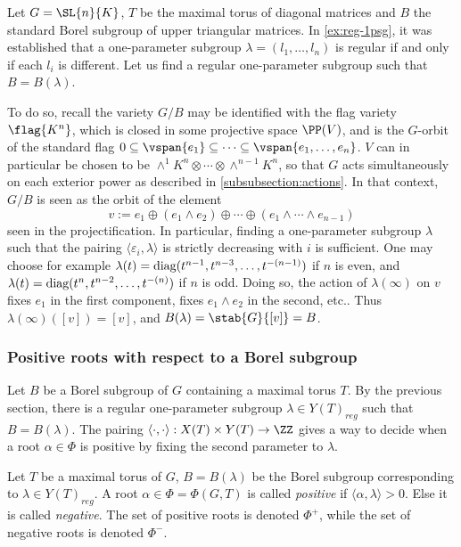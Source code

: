 \begin{exmp}\label{ex:reg_1psg_borel}
    Let $G = \SL{n}{K}$, $T$ be the maximal torus of diagonal matrices and $B$ the standard Borel subgroup of upper triangular matrices. In \cref{ex:reg-1psg}, it was established that a one-parameter subgroup $\lambda = (l_1, \ldots, l_n)$ is regular if and only if each $l_i$ is different. Let us find a regular one-parameter subgroup such that $B = B(\lambda)$.

    To do so, recall the variety $G/B$ may be identified with the flag variety $\flag{K^n}$, which is closed in some projective space $\PP(V)$, and is the $G$-orbit of the standard flag ${0 \subseteq \vspan{e_1} \subseteq \cdots \subseteq \vspan{e_1, \ldots, e_n}}$. $V$ can in particular be chosen to be ${\wedge^1 K^n \otimes \cdots \otimes \wedge^{n-1} K^n}$, so that $G$ acts simultaneously on each exterior power as described in \cref{subsubsection:actions}. In that context, $G/B$ is seen as the orbit of the element
    \[ v := e_1 \oplus \left(e_1 \wedge e_2 \right) \oplus \cdots \oplus \left(e_1 \wedge \cdots \wedge e_{n-1}\right)\]
    seen in the projectification. In particular, finding a one-parameter subgroup $\lambda$ such that the pairing $\langle \varepsilon_i, \lambda \rangle$ is strictly decreasing with $i$ is sufficient. One may choose for example $\lambda(t) = \textnormal{diag}(t^{n-1}, t^{n-3},\ldots, t^{-(n-1)})$ if $n$ is even, and $\lambda(t) = \textnormal{diag}(t^{n}, t^{n-2},\ldots, t^{-(n)})$ if $n$ is odd. Doing so, the action of $\lambda(\infty)$ on $v$ fixes $e_1$ in the first component, fixes $e_1 \wedge e_2$ in the second, etc.. Thus $\lambda(\infty)([v]) = [v]$, and $B(\lambda) = \stab{G}{[v]} = B$.
\end{exmp}

\subsubsection{Positive roots with respect to a Borel subgroup}

Let $B$ be a Borel subgroup of $G$ containing a maximal torus $T$. By the previous section, there is a regular one-parameter subgroup $\lambda \in {Y(T)}_{reg}$ such that $B = B(\lambda)$. The pairing $\langle \cdot , \cdot \rangle: X(T) \times Y(T) \to \ZZ$ gives a way to decide when a root $\alpha \in \Phi$ is positive by fixing the second parameter to $\lambda$.

\begin{defn}
    Let $T$ be a maximal torus of $G$, $B = B(\lambda)$ be the Borel subgroup corresponding to $\lambda \in {Y(T)}_{reg}$. A root $\alpha \in \Phi = \Phi(G,T)$ is called \emph{positive} if $\langle \alpha, \lambda \rangle > 0$. Else it is called \emph{negative}. The set of positive roots is denoted $\Phi^+$, while the set of negative roots is denoted $\Phi^{-}$.
\end{defn}

